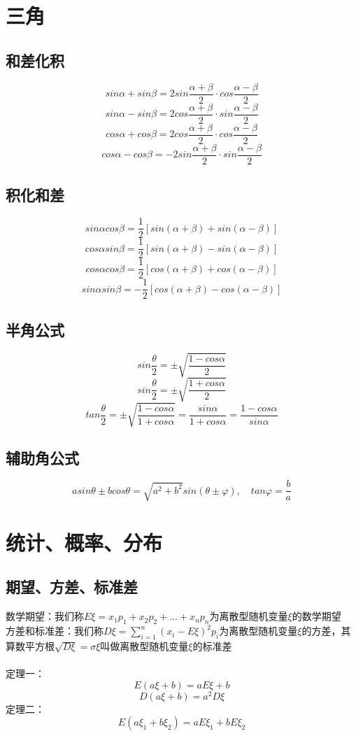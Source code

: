 \documentclass[UTF8]{ctexart}
\begin{document}
	\section{三角}
		\subsection{和差化积}
			\[sin\alpha+sin\beta=2sin\frac{\alpha+\beta}{2}\cdot cos\frac{\alpha-\beta}{2}\]
			\[sin\alpha-sin\beta=2cos\frac{\alpha+\beta}{2}\cdot sin\frac{\alpha-\beta}{2}\]
			\[cos\alpha+cos\beta=2cos\frac{\alpha+\beta}{2}\cdot cos\frac{\alpha-\beta}{2}\]
			\[cos\alpha-cos\beta=-2sin\frac{\alpha+\beta}{2}\cdot sin\frac{\alpha-\beta}{2}\]
		\subsection{积化和差}
			\[sin\alpha cos\beta=\frac{1}{2}\left[sin(\alpha+\beta)+sin(\alpha-\beta)\right]\]
			\[cos\alpha sin\beta=\frac{1}{2}\left[sin(\alpha+\beta)-sin(\alpha-\beta)\right]\]
			\[cos\alpha cos\beta=\frac{1}{2}\left[cos(\alpha+\beta)+cos(\alpha-\beta)\right]\]
			\[sin\alpha sin\beta=-\frac{1}{2}\left[cos(\alpha+\beta)-cos(\alpha-\beta)\right]\]
		\subsection{半角公式}
			\[sin\frac{\theta}{2}=\pm \sqrt{\frac{1-cos\alpha}{2}}\]
			\[sin\frac{\theta}{2}=\pm \sqrt{\frac{1+cos\alpha}{2}}\]
			\[tan\frac{\theta}{2}=\pm \sqrt{\frac{1-cos\alpha}{1+cos\alpha}}=\frac{sin\alpha}{1+cos\alpha}=\frac{1-cos\alpha}{sin\alpha}\]
		\subsection{辅助角公式}
			\[asin\theta\pm bcos\theta=\sqrt{a^2+b^2}sin(\theta\pm\varphi),\quad tan\varphi=\frac{b}{a}\]
	\section{统计、概率、分布}
		\subsection{期望、方差、标准差}
			数学期望：我们称$E\xi = x_1 p_1+x_2 p_2+\dots+x_n p_n$为离散型随机变量$\xi$的数学期望\\
			\indent 方差和标准差：我们称$D\xi = \sum_{i=1}^{n}(x_i-E\xi)^2 p_i$为离散型随机变量$\xi$的方差，其算数平方根$\sqrt{D\xi}=\sigma\xi$叫做离散型随机变量$\xi$的标准差\\
			\\
			定理一：
			\[E(a\xi+b)=aE\xi+b\]
			\[D(a\xi+b)=a^2 D\xi\]
			定理二：
			\[E(a\xi _1+b\xi _2)=aE\xi _1+bE\xi _2\]
\end{document}
